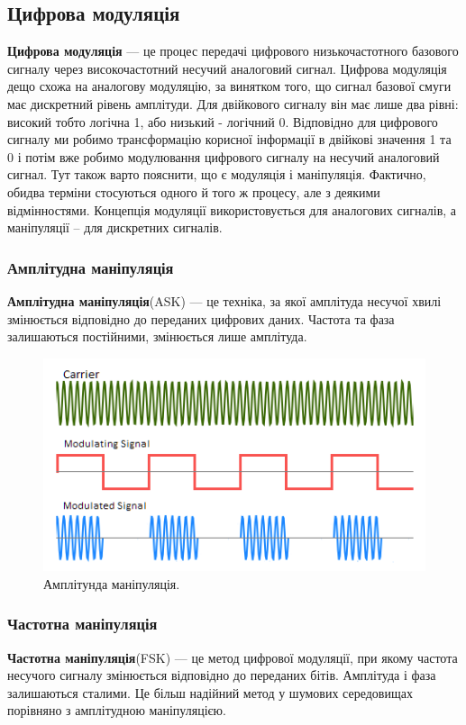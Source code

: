 \documentclass{article}
\begin{document}
\subsection{Цифрова модуляція}
\textbf{Цифрова модуляція} --- це процес передачі цифрового низькочастотного базового сигналу через високочастотний несучий аналоговий сигнал. Цифрова модуляція дещо схожа на аналогову модуляцію, за винятком того, що сигнал базової смуги має дискретний рівень амплітуди. Для двійкового сигналу він має лише два рівні: високий тобто логічна 1, або низький - логічний 0. Відповідно для цифрового сигналу ми робимо трансформацію корисної інформації в двійкові значення 1 та 0 і потім вже робимо модулювання цифрового сигналу на несучий аналоговий сигнал. Тут також варто пояснити, що є модуляція і маніпуляція. Фактично, обидва терміни стосуються одного й того ж процесу, але з деякими відмінностями. Концепція модуляції використовується для аналогових сигналів, а маніпуляції – для дискретних сигналів.

\subsubsection{Амплітудна маніпуляція}
\textbf{Амплітудна маніпуляція}(ASK) --- це техніка, за якої амплітуда несучої хвилі змінюється відповідно до переданих цифрових даних. Частота та фаза залишаються постійними, змінюється лише амплітуда. 

\begin{figure}[h!]
	\centering
	\includegraphics[width=0.6\linewidth]{images/ask.png}
	\caption{\label{fig:ask}Амплітунда маніпуляція.}
\end{figure}

\subsubsection{Частотна маніпуляція}
\textbf{Частотна маніпуляція}(FSK) --- це метод цифрової модуляції, при якому частота несучого сигналу змінюється відповідно до переданих бітів. Амплітуда і фаза залишаються сталими. Це більш надійний метод у шумових середовищах порівняно з амплітудною маніпуляцією.
\end{document}
